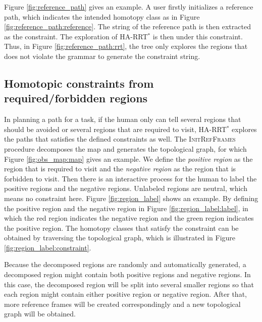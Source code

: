 \documentclass[letterpaper, 10 pt, conference]{ieeeconf}
\begin{document}
Figure \ref{fig:reference_path} gives an example.
A user firstly initializes a reference path, which indicates the intended homotopy class as in Figure \ref{fig:reference_path:reference}.
The string of the reference path is then extracted as the constraint.
The exploration of HA-RRT$^{*}$ is then under this constraint.
Thus, in Figure \ref{fig:reference_path:rrt}, the tree only explores the regions that does not violate the grammar to generate the constraint string.

\subsection{Homotopic constraints from required/forbidden regions}

In planning a path for a task, if the human only can tell several regions that should be avoided or several regions that are required to visit, HA-RRT$^{*}$ explores the paths that satisfies the defined constraints as well.
The \textsc{InitRefFrames} procedure decomposes the map and generates the topological graph, for which Figure \ref{fig:obs_map:map} gives an example.
We define the \emph{positive region} as the region that is required to visit and the \emph{negative region} as the region that is forbidden to visit.
Then there is an interactive process for the human to label the positive regions and the negative regions.
Unlabeled regions are neutral, which means no constraint here.
Figure \ref{fig:region_label} shows an example.
By defining the positive region and the negative region in Figure \ref{fig:region_label:label}, in which the red region indicates the negative region and the green region indicates the positive region.
The homotopy classes that satisfy the constraint can be obtained by traversing the topological graph, which is illustrated in Figure \ref{fig:region_label:constraint}.

Because the decomposed regions are randomly and automatically generated, a decomposed region might contain both positive regions and negative regions.
In this case, the decomposed region will be split into several smaller regions so that each region might contain either positive region or negative region.
After that, more reference frames will be created correspondingly and a new topological graph will be obtained.
\end{document}
